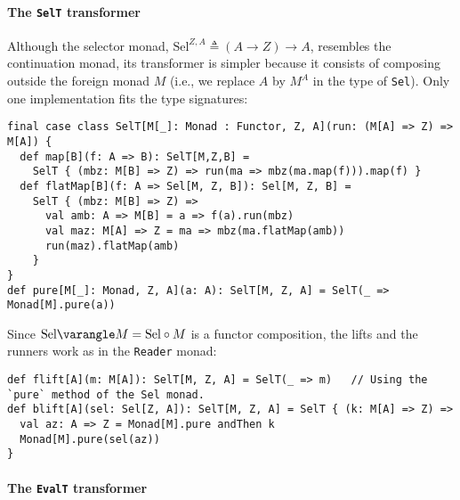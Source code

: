 \paragraph{The \texttt{SelT} transformer}

Although the selector monad, $\text{Sel}^{Z,A}\triangleq\left(A\rightarrow Z\right)\rightarrow A$,
resembles the continuation monad, its transformer is simpler because
it consists of composing outside the foreign monad $M$ (i.e., we
replace $A$ by $M^{A}$ in the type of \lstinline!Sel!). Only one
implementation fits the type signatures:
\begin{lstlisting}
final case class SelT[M[_]: Monad : Functor, Z, A](run: (M[A] => Z) => M[A]) {
  def map[B](f: A => B): SelT[M,Z,B] =
    SelT { (mbz: M[B] => Z) => run(ma => mbz(ma.map(f))).map(f) }
  def flatMap[B](f: A => Sel[M, Z, B]): Sel[M, Z, B] =
    SelT { (mbz: M[B] => Z) =>
      val amb: A => M[B] = a => f(a).run(mbz)
      val maz: M[A] => Z = ma => mbz(ma.flatMap(amb))
      run(maz).flatMap(amb)
    }
}
def pure[M[_]: Monad, Z, A](a: A): SelT[M, Z, A] = SelT(_ => Monad[M].pure(a))
\end{lstlisting}
Since $\text{Sel}\varangle M=\text{Sel}\circ M$ is a functor composition,
the lifts and the runners work as in the \lstinline!Reader! monad:
\begin{lstlisting}
def flift[A](m: M[A]): SelT[M, Z, A] = SelT(_ => m)   // Using the `pure` method of the Sel monad.
def blift[A](sel: Sel[Z, A]): SelT[M, Z, A] = SelT { (k: M[A] => Z) =>
  val az: A => Z = Monad[M].pure andThen k
  Monad[M].pure(sel(az))
}
\end{lstlisting}


\paragraph{The \texttt{EvalT} transformer}

